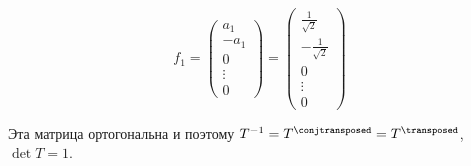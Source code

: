 \begin{propose}
\begin{minipage}{\textwidth}
    \[
             f_1
             = \begin{pmatrix}a_1 \\ -a_1 \\ 0 \\ \vdots \\ 0 \end{pmatrix}
             = \begin{pmatrix}\frac1{\sqrt2} \\ - \frac{1}{\sqrt2} \\ 0 \\ \vdots \\ 0 \end{pmatrix}
             \]

    Эта матрица ортогональна и поэтому
    \( T^{-1} = T^\conjtransposed = T^\transposed \),
    \( \det T = 1 \).
        \end{minipage}
\end{propose}
